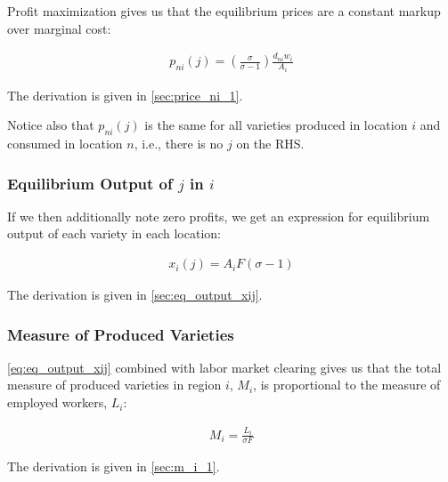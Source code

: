 \documentclass[10pt]{article}
\begin{document}
Profit maximization  
gives us that 
the equilibrium prices are a 
constant markup over marginal cost:

\begin{align}
    p_{n i}(j)=\left(\frac{\sigma}{\sigma-1}\right) \frac{d_{n i} w_i}{A_i} \label{eq:price_ni_1}
\end{align}

The derivation is given in \autoref{sec:price_ni_1}.

Notice also that $p_{n i}(j)$ is the 
same for all varieties produced in location $i$ and 
consumed in location $n$, i.e.,
there is no $j$ on the RHS. 

\subsubsection{Equilibrium Output of $j$ in $i$}

If we then additionally note zero profits, we get
an expression for equilibrium output of each variety
in each location:

\begin{align}
    x_i(j)=A_i F(\sigma-1) \label{eq:eq_output_xij}
\end{align}

The derivation is given in \autoref{sec:eq_output_xij}.

\subsubsection{Measure of Produced Varieties}

\eqref{eq:eq_output_xij} combined with labor market 
clearing gives us that 
the total measure of produced varieties in region $i$, $M_i$,
is proportional to the 
measure of employed workers, $L_i$:

\begin{align}
    M_i = \frac{L_i}{\sigma F} \label{eq:m_i_1}
\end{align}

The derivation is given in \autoref{sec:m_i_1}.


\end{document}
